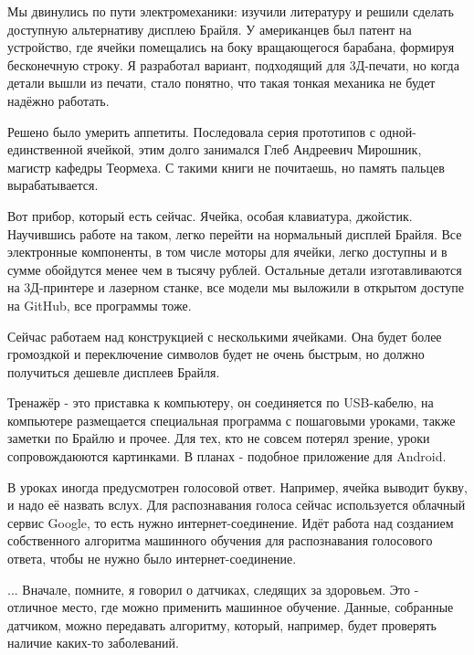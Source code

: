 \documentclass[a4paper,12pt]{article} %
\begin{document}
Мы двинулись по пути электромеханики: изучили литературу и решили сделать доступную альтернативу дисплею Брайля. У американцев был патент на устройство, где ячейки помещались на боку вращающегося барабана, формируя бесконечную строку. Я разработал вариант, подходящий для 3Д-печати, но когда детали вышли из печати, стало понятно, что такая тонкая механика не будет надёжно работать.

Решено было умерить аппетиты. Последовала серия прототипов с одной-единственной ячейкой, этим долго занимался Глеб Андреевич Мирошник, магистр кафедры Теормеха. С такими книги не почитаешь, но память пальцев вырабатывается.

Вот прибор, который есть сейчас. Ячейка, особая клавиатура, джойстик. Научившись работе на таком, легко перейти на нормальный дисплей Брайля. Все электронные компоненты, в том числе моторы для ячейки, легко доступны и в сумме обойдутся менее чем в тысячу рублей. Остальные детали изготавливаются на 3Д-принтере и лазерном станке, все модели мы выложили в открытом доступе на GitHub, все программы тоже. 

Сейчас работаем над конструкцией с несколькими ячейками. Она будет более громоздкой и переключение символов будет не очень быстрым, но должно получиться дешевле дисплеев Брайля.

Тренажёр - это приставка к компьютеру, он соединяется по USB-кабелю, на компьютере размещается специальная программа с пошаговыми уроками, также заметки по Брайлю и прочее. Для тех, кто не совсем потерял зрение, уроки сопровождаюются картинками. В планах - подобное приложение для Android.

В уроках иногда предусмотрен голосовой ответ. Например, ячейка выводит букву, и надо её назвать вслух. Для распознавания голоса сейчас используется облачный сервис Google, то есть нужно интернет-соединение. Идёт работа над созданием собственного алгоритма машинного обучения для распознавания голосового ответа, чтобы не нужно было интернет-соединение.

\hrulefill


... Вначале, помните, я говорил о датчиках, следящих за здоровьем. Это - отличное место, где можно применить машинное обучение. Данные, собранные датчиком, можно передавать алгоритму, который, например, будет проверять наличие каких-то заболеваний.\\
\end{document}
